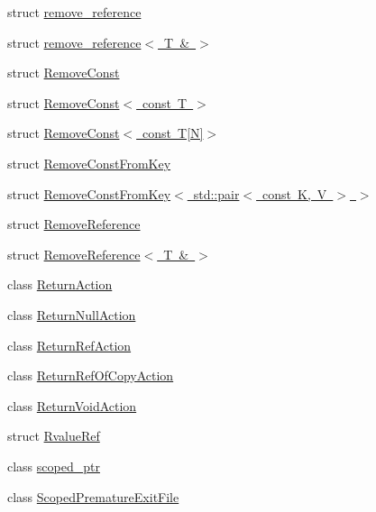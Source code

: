 \begin{DoxyCompactItemize}
\item 
struct \mbox{\hyperlink{structtesting_1_1internal_1_1remove__reference}{remove\+\_\+reference}}
\item 
struct \mbox{\hyperlink{structtesting_1_1internal_1_1remove__reference_3_01_t_01_6_01_4}{remove\+\_\+reference$<$ T \& $>$}}
\item 
struct \mbox{\hyperlink{structtesting_1_1internal_1_1_remove_const}{Remove\+Const}}
\item 
struct \mbox{\hyperlink{structtesting_1_1internal_1_1_remove_const_3_01const_01_t_01_4}{Remove\+Const$<$ const T $>$}}
\item 
struct \mbox{\hyperlink{structtesting_1_1internal_1_1_remove_const_3_01const_01_t[_n]_4}{Remove\+Const$<$ const T\mbox{[}\+N\mbox{]}$>$}}
\item 
struct \mbox{\hyperlink{structtesting_1_1internal_1_1_remove_const_from_key}{Remove\+Const\+From\+Key}}
\item 
struct \mbox{\hyperlink{structtesting_1_1internal_1_1_remove_const_from_key_3_01std_1_1pair_3_01const_01_k_00_01_v_01_4_01_4}{Remove\+Const\+From\+Key$<$ std\+::pair$<$ const K, V $>$ $>$}}
\item 
struct \mbox{\hyperlink{structtesting_1_1internal_1_1_remove_reference}{Remove\+Reference}}
\item 
struct \mbox{\hyperlink{structtesting_1_1internal_1_1_remove_reference_3_01_t_01_6_01_4}{Remove\+Reference$<$ T \& $>$}}
\item 
class \mbox{\hyperlink{classtesting_1_1internal_1_1_return_action}{Return\+Action}}
\item 
class \mbox{\hyperlink{classtesting_1_1internal_1_1_return_null_action}{Return\+Null\+Action}}
\item 
class \mbox{\hyperlink{classtesting_1_1internal_1_1_return_ref_action}{Return\+Ref\+Action}}
\item 
class \mbox{\hyperlink{classtesting_1_1internal_1_1_return_ref_of_copy_action}{Return\+Ref\+Of\+Copy\+Action}}
\item 
class \mbox{\hyperlink{classtesting_1_1internal_1_1_return_void_action}{Return\+Void\+Action}}
\item 
struct \mbox{\hyperlink{structtesting_1_1internal_1_1_rvalue_ref}{Rvalue\+Ref}}
\item 
class \mbox{\hyperlink{classtesting_1_1internal_1_1scoped__ptr}{scoped\+\_\+ptr}}
\item 
class \mbox{\hyperlink{classtesting_1_1internal_1_1_scoped_premature_exit_file}{Scoped\+Premature\+Exit\+File}}

\end{DoxyCompactItemize}
